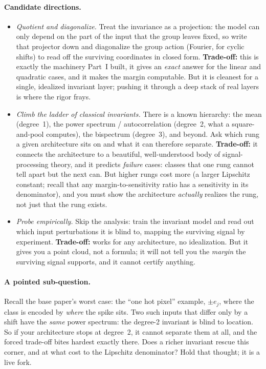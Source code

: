 \paragraph{Candidate directions.}
\begin{itemize}[leftmargin=1.4em]
  \item \emph{Quotient and diagonalize.} Treat the invariance as a projection: the model can only
        depend on the part of the input that the group leaves fixed, so write that projector down and
        diagonalize the group action (Fourier, for cyclic shifts) to read off the surviving
        coordinates in closed form. \textbf{Trade-off:} this is exactly the machinery Part~I built,
        it gives an \emph{exact} answer for the linear and quadratic cases, and it makes the margin
        computable. But it is cleanest for a single, idealized invariant layer; pushing it through a
        deep stack of real layers is where the rigor frays.
  \item \emph{Climb the ladder of classical invariants.} There is a known hierarchy: the mean
        (degree~1), the power spectrum / autocorrelation (degree~2, what a square-and-pool computes),
        the bispectrum (degree~3), and beyond. Ask which rung a given architecture sits on and what
        it can therefore separate. \textbf{Trade-off:} it connects the architecture to a beautiful,
        well-understood body of signal-processing theory, and it predicts \emph{failure} cases:
        classes that one rung cannot tell apart but the next can. But higher rungs cost more
        (a larger Lipschitz constant; recall that any margin-to-sensitivity ratio has a sensitivity
        in its denominator), and you must show the
        architecture \emph{actually} realizes the rung, not just that the rung exists.
  \item \emph{Probe empirically.} Skip the analysis: train the invariant model and read out which
        input perturbations it is blind to, mapping the surviving signal by experiment.
        \textbf{Trade-off:} works for any architecture, no idealization. But it gives you a point
        cloud, not a formula; it will not tell you the \emph{margin} the surviving signal supports,
        and it cannot certify anything.
\end{itemize}

\paragraph{A pointed sub-question.} Recall the base paper's worst case: the ``one hot pixel''
example, $\pm e_j$, where the class is encoded by \emph{where} the spike sits. Two such inputs that
differ only by a shift have the \emph{same} power spectrum: the degree-2 invariant is blind to
location. So if your architecture stops at degree~2, it cannot separate them at all, and the forced
trade-off bites hardest exactly there. Does a richer invariant rescue this corner, and at what cost
to the Lipschitz denominator? Hold that thought; it is a live fork.

